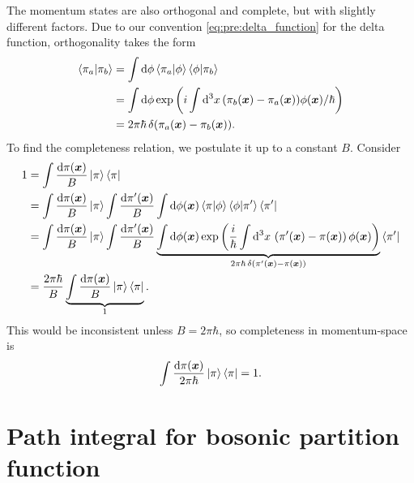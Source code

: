 The momentum states are also orthogonal and complete, but with slightly different factors.
Due to our convention \eqref{eq:pre:delta_function} for the delta function, orthogonality takes the form
\begin{equation}
\begin{split}
	\braket{\pi_a | \pi_b} &= \int \mathop{}\!\mathrm{d} \phi \braket{\pi_a | \phi} \braket{\phi | \pi_b} \\
	                       &= \int \mathop{}\!\mathrm{d} \phi \exp \left( i \int \mathop{}\!\mathrm{d}^3 x \, (\pi_b({\bm{x}}) - \pi_a({\bm{x}})) \phi({\bm{x}}) / \hbar \right) \\
						   &= 2 \pi \hbar \, \delta(\pi_a({\bm{x}}) - \pi_b({\bm{x}})) .
\end{split}
\end{equation}
To find the completeness relation, we postulate it up to a constant $B$.
Consider
\begin{equation}
\begin{split}
	1 &= \int \frac{\dif \pi(\vec{x})}{B} \ket{\pi} \bra{\pi} \\
	  &= \int \frac{\dif \pi(\vec{x})}{B} \ket{\pi} \int \frac{\dif \pi'(\vec{x})}{B} \int \dif \phi(\vec{x}) \braket{\pi | \phi} \braket{\phi | \pi'} \bra{\pi'} \\
	  &= \int \frac{\dif \pi(\vec{x})}{B} \ket{\pi} \int \frac{\dif \pi'(\vec{x})}{B} \underbrace{\int \dif \phi(\vec{x}) \exp \left( \frac{i}{\hbar} \int \dif^3 x \, \left( \pi'(\vec{x}) - \pi(\vec{x}) \right) \phi(\vec{x}) \right)}_{2 \pi \hbar \, \delta(\pi'(\vec{x}) - \pi(\vec{x}))} \bra{\pi'} \\
	  &= \frac{2 \pi \hbar}{B} \underbrace{\int \frac{\dif \pi(\vec{x})}{B} \ket{\pi} \bra{\pi}}_{1} .
\end{split}
\end{equation}
This would be inconsistent unless $B = 2 \pi \hbar$, so completeness in momentum-space is
\begin{equation}
	\int \frac{\mathop{}\!\mathrm{d} \pi({\bm{x}})}{2 \pi \hbar} \ket{\pi} \bra{\pi} = 1 .
\end{equation}

\section{Path integral for bosonic partition function}

